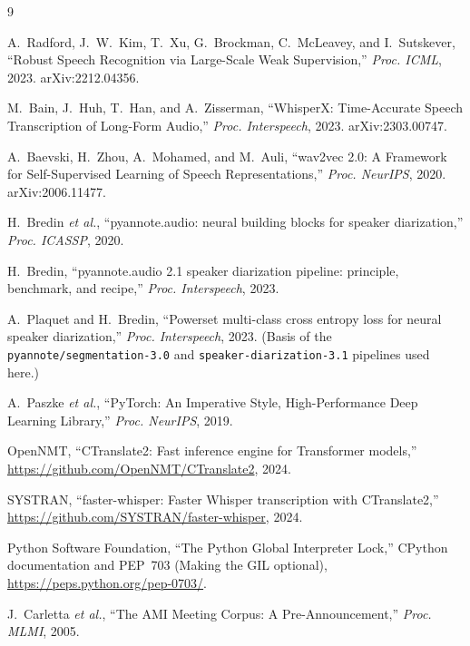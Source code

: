 \documentclass[10pt]{article}
\begin{document}
\begin{thebibliography}{9}

A.~Radford, J.~W.~Kim, T.~Xu, G.~Brockman, C.~McLeavey, and I.~Sutskever,
``Robust Speech Recognition via Large-Scale Weak Supervision,''
\emph{Proc. ICML}, 2023. arXiv:2212.04356.

M.~Bain, J.~Huh, T.~Han, and A.~Zisserman,
``WhisperX: Time-Accurate Speech Transcription of Long-Form Audio,''
\emph{Proc. Interspeech}, 2023. arXiv:2303.00747.

A.~Baevski, H.~Zhou, A.~Mohamed, and M.~Auli,
``wav2vec 2.0: A Framework for Self-Supervised Learning of Speech
Representations,'' \emph{Proc. NeurIPS}, 2020. arXiv:2006.11477.

H.~Bredin \emph{et al.},
``pyannote.audio: neural building blocks for speaker diarization,''
\emph{Proc. ICASSP}, 2020.

H.~Bredin,
``pyannote.audio 2.1 speaker diarization pipeline: principle, benchmark, and
recipe,'' \emph{Proc. Interspeech}, 2023.

A.~Plaquet and H.~Bredin,
``Powerset multi-class cross entropy loss for neural speaker diarization,''
\emph{Proc. Interspeech}, 2023. (Basis of the \texttt{pyannote/segmentation-3.0}
and \texttt{speaker-diarization-3.1} pipelines used here.)

A.~Paszke \emph{et al.},
``PyTorch: An Imperative Style, High-Performance Deep Learning Library,''
\emph{Proc. NeurIPS}, 2019.

OpenNMT, ``CTranslate2: Fast inference engine for Transformer models,''
\url{https://github.com/OpenNMT/CTranslate2}, 2024.

SYSTRAN, ``faster-whisper: Faster Whisper transcription with CTranslate2,''
\url{https://github.com/SYSTRAN/faster-whisper}, 2024.

Python Software Foundation, ``The Python Global Interpreter Lock,'' CPython
documentation and PEP~703 (Making the GIL optional),
\url{https://peps.python.org/pep-0703/}.

J.~Carletta \emph{et al.},
``The AMI Meeting Corpus: A Pre-Announcement,''
\emph{Proc. MLMI}, 2005.

\end{thebibliography}
\end{document}
